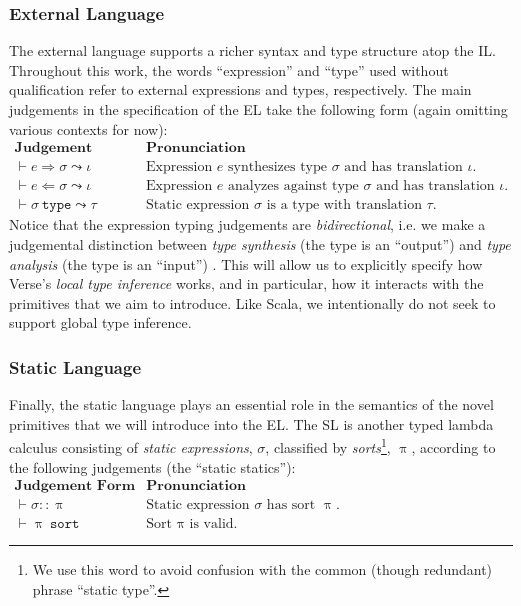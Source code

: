 \subsubsection{External Language}
The external language supports a richer syntax and type structure atop the IL. Throughout this work, the words ``expression'' and ``type'' used without qualification refer to external expressions and types, respectively. The main judgements in the specification of the EL take the following form  (again omitting various contexts for now): 
\\[1ex]
$\begin{array}{ll}
\textbf{Judgement Form} & \textbf{Pronunciation}\\
\vdash e \Rightarrow \sigma \leadsto \iota & \text{Expression $e$ synthesizes type $\sigma$ and has translation $\iota$.}\\
\vdash e \Leftarrow \sigma \leadsto \iota & \text{Expression $e$ analyzes against type $\sigma$ and has translation $\iota$.}\\
\vdash \sigma~\mathtt{type} \leadsto \tau & \text{Static expression $\sigma$ is a type with translation $\tau$.}
\end{array}
$\\[1ex]
Notice that the expression typing judgements are \emph{bidirectional}, i.e. we make a judgemental distinction between \emph{type synthesis} (the type is an ``output'') and \emph{type analysis} (the type is an ``input'') \cite{Pierce:2000:LTI:345099.345100}. This will  allow us to explicitly specify how Verse's \emph{local type inference} works, and in particular, how it interacts with the primitives that we aim to introduce. Like Scala, we intentionally do not seek to support global type inference. %


\subsubsection{Static Language}
Finally, the static language plays an essential role in the semantics of the novel primitives that we will introduce into the EL. The SL is another typed lambda calculus consisting of \emph{static expressions}, $\sigma$, classified by \emph{sorts}\footnote{We use this word to avoid confusion with the common (though redundant) phrase ``static type''.}, $\uppi$, according to the following judgements (the ``static statics''):
\\[1ex]
$
\begin{array}{ll}
\textbf{Judgement Form} & \textbf{Pronunciation}\\
\vdash \sigma :: \uppi & \text{Static expression $\sigma$ has sort $\uppi$.}\\
\vdash \uppi~\mathtt{sort} & \text{Sort $\uppi$ is valid.}
\end{array}
$\\

